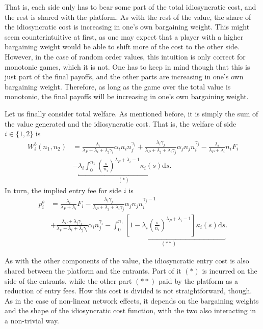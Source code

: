 \documentclass[a4paper]{article}
\newcommand{\ds}{\mathrm{d}s}
\begin{document}
That is, each side only has to bear some part of the total idiosyncratic cost, and the rest is shared with the platform.
As with the rest of the value, the share of the idiosyncratic cost is increasing in one's own bargaining weight.
This might seem counterintuitive at first, as one may expect that a player with a higher bargaining weight would be able to shift more of the cost to the other side.
However, in the case of random order values, this intuition is only correct for monotonic games, which it is not.
One has to keep in mind though that this is just part of the final payoffs, and the other parts are increasing in one's own bargaining weight.
Therefore, as long as the game over the total value is monotonic, the final payoffs will be increasing in one's own bargaining weight.

Let us finally consider total welfare.
As mentioned before, it is simply the sum of the value generated and the idiosyncratic cost.
That is, the welfare of side $i \in \{1, 2\}$ is
\begin{align*}
    W_i^b(n_1, n_2) &= \frac{\lambda_i}{\lambda_P + \lambda_i + \lambda_j\gamma_i} \alpha_i n_i n_j^{\gamma_i} + \frac{\lambda_i \gamma_j}{\lambda_P + \lambda_j + \lambda_i\gamma_j} \alpha_j n_j n_i^{\gamma_j} - \frac{\lambda_i}{\lambda_P + \lambda_i} n_i F_i \\
    &- \underbracket{\lambda_i \int_0^{n_1} \left( \frac{s}{n_i} \right)^{\lambda_P + \lambda_i - 1} \kappa_i(s) \ds }_{(*)}.
\end{align*}
In turn, the implied entry fee for side $i$ is
\begin{align*}
    p_i^b &= \frac{\lambda_i}{\lambda_P + \lambda_i} F_i - \frac{\lambda_i \gamma_j}{\lambda_P + \lambda_j + \lambda_i\gamma_j} \alpha_j n_j n_i^{\gamma_j - 1} \\
    &+ \frac{\lambda_P + \lambda_j\gamma_i}{\lambda_P + \lambda_i + \lambda_j\gamma_i} \alpha_i n_j^{\gamma_i} - \underbracket{\int_0^{n_1} \left[ 1 - \lambda_i \left( \frac{s}{n_i} \right)^{\lambda_P + \lambda_i - 1} \right] \kappa_i(s) \ds}_{(**)}.
\end{align*}

As with the other components of the value, the idiosyncratic entry cost is also shared between the platform and the entrants.
Part of it $(*)$ is incurred on the side of the entrants, while the other part $(**)$ paid by the platform as a reduction of entry fees.
How this cost is divided is not straightforward, though.
As in the case of non-linear network effects, it depends on the bargaining weights and the shape of the idiosyncratic cost function, with the two also interacting in a non-trivial way.
\end{document}
